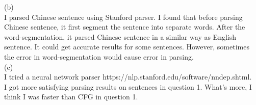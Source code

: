 \documentclass[11pt]{article}
\begin{document}
(b)\\
I parsed Chinese sentence using Stanford parser. I found that before parsing Chinese sentence, it first segment the sentence into separate words. After the word-segmentation, it parsed Chinese sentence in a similar way as English sentence. It could get accurate results for some sentences. However, sometimes the error in word-segmentation would cause error in parsing.\\

(c)\\
I tried a neural network parser https://nlp.stanford.edu/software/nndep.shtml.  \\
I got more satisfying parsing results on sentences in question 1. What's more, I think I was faster than CFG in question 1. \\
\end{document}
